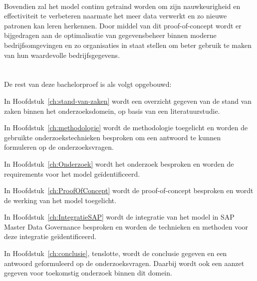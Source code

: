 \\
Bovendien zal het model continu getraind worden om zijn nauwkeurigheid en effectiviteit te verbeteren naarmate het meer data verwerkt en zo nieuwe patronen kan leren herkennen. Door middel van dit proof-of-concept wordt er bijgedragen aan de optimalisatie van gegevensbeheer binnen moderne bedrijfsomgevingen en zo organisaties in staat stellen om beter gebruik te maken van hun waardevolle bedrijfsgegevens.

\section{}%
\label{sec:opzet-bachelorproef}


De rest van deze bachelorproef is als volgt opgebouwd:

In Hoofdstuk~\ref{ch:stand-van-zaken} wordt een overzicht gegeven van de stand van zaken binnen het onderzoeksdomein, op basis van een literatuurstudie.

In Hoofdstuk~\ref{ch:methodologie} wordt de methodologie toegelicht en worden de gebruikte onderzoekstechnieken besproken om een antwoord te kunnen formuleren op de onderzoeksvragen.

In Hoofdstuk~\ref{ch:Onderzoek} wordt het onderzoek besproken en worden de requirements voor het model geïdentificeerd.

In Hoofdstuk~\ref{ch:ProofOfConcept} wordt de proof-of-concept besproken en wordt de werking van het model toegelicht.

In Hoofdstuk~\ref{ch:IntegratieSAP} wordt de integratie van het model in SAP Master Data Governance besproken en worden de technieken en methoden voor deze integratie geïdentificeerd.

In Hoofdstuk~\ref{ch:conclusie}, tenslotte, wordt de conclusie gegeven en een antwoord geformuleerd op de onderzoeksvragen. Daarbij wordt ook een aanzet gegeven voor toekomstig onderzoek binnen dit domein.